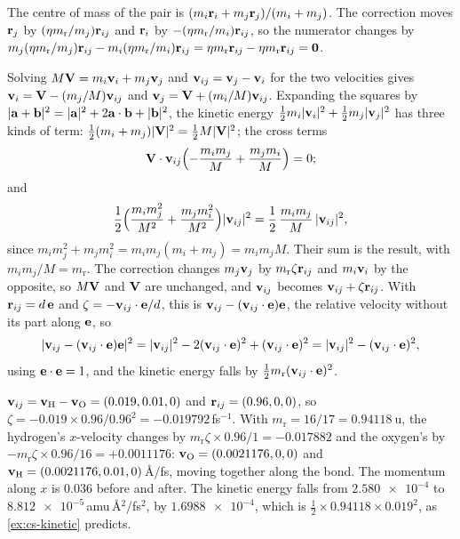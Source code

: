 The centre of mass of the pair is $(m_i\bm{\mathrm{r}}_i
+ m_j\bm{\mathrm{r}}_j)/(m_i + m_j)$. The correction moves $\bm{\mathrm{r}}_j$ by
$(\eta m_{\mathrm r}/m_j)\bm{\mathrm{r}}_{ij}$ and $\bm{\mathrm{r}}_i$ by $-(\eta m_{\mathrm
r}/m_i)\bm{\mathrm{r}}_{ij}$, so the numerator changes by $m_j(\eta m_{\mathrm
r}/m_j)\bm{\mathrm{r}}_{ij} - m_i(\eta m_{\mathrm r}/m_i)\bm{\mathrm{r}}_{ij} = \eta
m_{\mathrm r}\bm{\mathrm{r}}_{ij} - \eta m_{\mathrm r}\bm{\mathrm{r}}_{ij} = \bm{\mathrm{0}}$.

Solving $M\bm{\mathrm{V}} = m_i\bm{\mathrm{v}}_i + m_j\bm{\mathrm{v}}_j$
and $\bm{\mathrm{v}}_{ij} = \bm{\mathrm{v}}_j - \bm{\mathrm{v}}_i$ for the two velocities gives
$\bm{\mathrm{v}}_i = \bm{\mathrm{V}} - (m_j/M)\bm{\mathrm{v}}_{ij}$ and $\bm{\mathrm{v}}_j = \bm{\mathrm{V}} +
(m_i/M)\bm{\mathrm{v}}_{ij}$. Expanding the squares by $\lvert\bm{\mathrm{a}} +
\bm{\mathrm{b}}\rvert^2 = \lvert\bm{\mathrm{a}}\rvert^2 + 2\bm{\mathrm{a}}\cdot\bm{\mathrm{b}} +
\lvert\bm{\mathrm{b}}\rvert^2$, the kinetic energy
$\frac12m_i\lvert\bm{\mathrm{v}}_i\rvert^2 + \frac12m_j\lvert\bm{\mathrm{v}}_j\rvert^2$ has
three kinds of term: $\frac12(m_i + m_j)\lvert\bm{\mathrm{V}}\rvert^2 =
\frac12M\lvert\bm{\mathrm{V}}\rvert^2$; the cross terms
\begin{equation*}
   \bm{\mathrm{V}}\cdot\bm{\mathrm{v}}_{ij}\Bigl(-\frac{m_im_j}{M} + \frac{m_jm_i}{M}\Bigr)
   = 0 ;
\end{equation*}
and
\begin{equation*}
   \frac12\Bigl(\frac{m_im_j^2}{M^2} + \frac{m_jm_i^2}{M^2}\Bigr)
   \lvert\bm{\mathrm{v}}_{ij}\rvert^2
   = \frac12\,\frac{m_im_j}{M}\,\lvert\bm{\mathrm{v}}_{ij}\rvert^2 ,
\end{equation*}
since $m_im_j^2 + m_jm_i^2 = m_im_j(m_i + m_j) = m_im_jM$. Their sum is the
result, with $m_im_j/M = m_{\mathrm r}$. The correction changes $m_j\bm{\mathrm{v}}_j$ by
$m_{\mathrm r}\zeta\bm{\mathrm{r}}_{ij}$ and $m_i\bm{\mathrm{v}}_i$ by the opposite, so
$M\bm{\mathrm{V}}$ and $\bm{\mathrm{V}}$ are unchanged, and $\bm{\mathrm{v}}_{ij}$ becomes
$\bm{\mathrm{v}}_{ij} + \zeta\bm{\mathrm{r}}_{ij}$. With $\bm{\mathrm{r}}_{ij} = d\,\bm{\mathrm{e}}$ and
$\zeta = -\bm{\mathrm{v}}_{ij}\cdot\bm{\mathrm{e}}/d$, this is $\bm{\mathrm{v}}_{ij} -
(\bm{\mathrm{v}}_{ij}\cdot\bm{\mathrm{e}})\bm{\mathrm{e}}$, the relative velocity without its part
along $\bm{\mathrm{e}}$, so
\begin{equation*}
   \lvert\bm{\mathrm{v}}_{ij} - (\bm{\mathrm{v}}_{ij}\cdot\bm{\mathrm{e}})\bm{\mathrm{e}}\rvert^2
   = \lvert\bm{\mathrm{v}}_{ij}\rvert^2 - 2(\bm{\mathrm{v}}_{ij}\cdot\bm{\mathrm{e}})^2
   + (\bm{\mathrm{v}}_{ij}\cdot\bm{\mathrm{e}})^2 = \lvert\bm{\mathrm{v}}_{ij}\rvert^2
   - (\bm{\mathrm{v}}_{ij}\cdot\bm{\mathrm{e}})^2 ,
\end{equation*}
using $\bm{\mathrm{e}}\cdot\bm{\mathrm{e}} = 1$, and the kinetic energy falls by
$\frac12m_{\mathrm r}(\bm{\mathrm{v}}_{ij}\cdot\bm{\mathrm{e}})^2$.

$\bm{\mathrm{v}}_{ij} = \bm{\mathrm{v}}_{\mathrm H} - \bm{\mathrm{v}}_{\mathrm
O} = (0.019, 0.01, 0)$ and $\bm{\mathrm{r}}_{ij} = (0.96, 0, 0)$, so $\zeta =
-0.019\times0.96/0.96^2 = -0.019792$\,fs$^{-1}$. With $m_{\mathrm r} =
16/17 = \SI{0.94118}{\amu}$, the hydrogen's $x$-velocity changes by
$m_{\mathrm r}\zeta\times0.96/1 = -0.017882$ and the oxygen's by
$-m_{\mathrm r}\zeta\times0.96/16 = +0.0011176$: $\bm{\mathrm{v}}_{\mathrm O} =
(0.0021176, 0, 0)$ and $\bm{\mathrm{v}}_{\mathrm H} = (0.0021176, 0.01, 0)$\,\AA/fs,
moving together along the bond. The momentum along $x$ is 0.036 before
and after. The kinetic energy falls from $\num{2.580e-4}$ to
$\num{8.812e-5}$\,amu\,\AA$^2$/fs$^2$, by $\num{1.6988e-4}$, which is
$\frac12\times0.94118\times0.019^2$, as \cref{ex:cs-kinetic} predicts.


